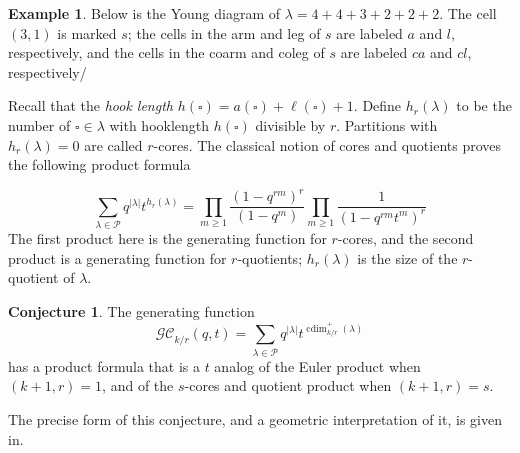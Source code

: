 \documentclass{amsart}[12pt]
\theoremstyle{definition}
\newtheorem{example}[dummy]{Example}
\newtheorem{conjecture}[dummy]{Conjecture}
\newcommand{\PP}{\mathcal{P}} %
\DeclareMathOperator{\cdim}{cdim}
\newcommand{\Gcomb}{\mathcal{GC}}
\begin{document}
\begin{example}
Below is the Young diagram of $\lambda=4+4+3+2+2+2$.  The cell $(3,1)$ is marked $s$; the cells in the arm and leg of $s$ are labeled $a$ and $l$, respectively, and the cells in the coarm and coleg of $s$ are labeled $ca$ and $cl$, respectively/
\begin{center}
\end{center}
\end{example}


Recall that the \emph{hook length} $h(\square)=a(\square)+\ell(\square)+1$.  Define $h_r(\lambda)$ to be the number of $\square\in\lambda$ with hooklength $h(\square)$ divisible by $r$.  Partitions with $h_r(\lambda)=0$ are called $r$-cores.  The classical notion of cores and quotients proves the following product formula

\[\sum_{\lambda\in\PP} q^{|\lambda|}t^{h_r(\lambda)}=\prod_{m\geq 1} \frac{(1-q^{rm})^r}{(1-q^m)}\prod_{m\geq 1}\frac{1}{(1-q^{rm}t^m)^r}\]
The first product here is the generating function for $r$-cores, and the second product is a generating function for $r$-quotients; $h_r(\lambda)$ is the size of the $r$-quotient of $\lambda$.  

\begin{conjecture}
  The generating function
  \[ \Gcomb_{k/r}(q,t)=\sum_{\lambda\in\PP}q^{|\lambda|}t^{\cdim^+_{k/r}(\lambda)}\]
has a product formula that is a $t$ analog of the Euler product when $(k+1,r)=1$, and of the $s$-cores and quotient product when $(k+1,r)=s$.
\end{conjecture}

The precise form of this conjecture, and a geometric interpretation of it, is given in.  
\end{document}

